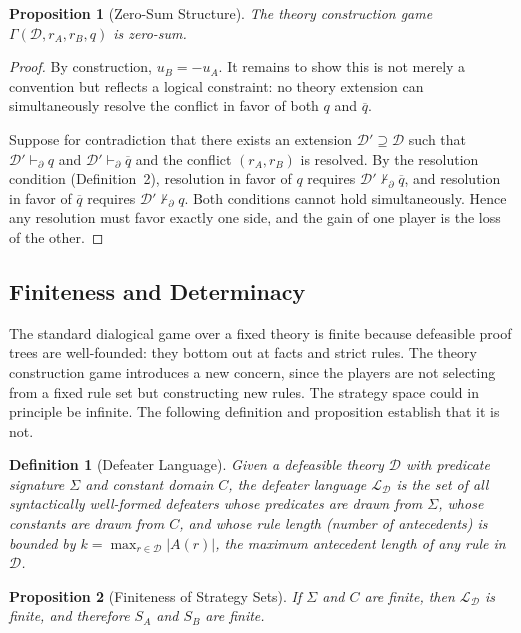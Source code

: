 \documentclass{article}
\newtheorem{definition}{Definition}
\newtheorem{proposition}{Proposition}
\newcommand{\D}{\mathcal{D}}
\newcommand{\comp}[1]{\overline{#1}}
\begin{document}
\begin{proposition}[Zero-Sum Structure]\label{prop:zerosum}
The theory construction game $\Gamma(\D, r_A, r_B, q)$ is zero-sum.
\end{proposition}
 
\begin{proof}
By construction, $u_B = -u_A$. It remains to show this is not merely a convention but reflects a logical constraint: no theory extension can simultaneously resolve the conflict in favor of both $q$ and $\comp{q}$.
 
Suppose for contradiction that there exists an extension $\D' \supseteq \D$ such that $\D' \vdash_\partial q$ and $\D' \vdash_\partial \comp{q}$ and the conflict $(r_A, r_B)$ is resolved. By the resolution condition (Definition~2), resolution in favor of $q$ requires $\D' \not\vdash_\partial \comp{q}$, and resolution in favor of $\comp{q}$ requires $\D' \not\vdash_\partial q$. Both conditions cannot hold simultaneously. Hence any resolution must favor exactly one side, and the gain of one player is the loss of the other.
\end{proof}
 
\subsection{Finiteness and Determinacy}
 
The standard dialogical game over a fixed theory is finite because defeasible proof trees are well-founded: they bottom out at facts and strict rules. The theory construction game introduces a new concern, since the players are not selecting from a fixed rule set but constructing new rules. The strategy space could in principle be infinite. The following definition and proposition establish that it is not.
 
\begin{definition}[Defeater Language]\label{def:defeater_lang}
Given a defeasible theory $\D$ with predicate signature $\Sigma$ and constant domain $C$, the defeater language $\mathcal{L}_\D$ is the set of all syntactically well-formed defeaters whose predicates are drawn from $\Sigma$, whose constants are drawn from $C$, and whose rule length (number of antecedents) is bounded by $k = \max_{r \in \D} |A(r)|$, the maximum antecedent length of any rule in $\D$.
\end{definition}
 
\begin{proposition}[Finiteness of Strategy Sets]\label{prop:finiteness}
If $\Sigma$ and $C$ are finite, then $\mathcal{L}_\D$ is finite, and therefore $S_A$ and $S_B$ are finite.
\end{proposition}
 
\end{document}
